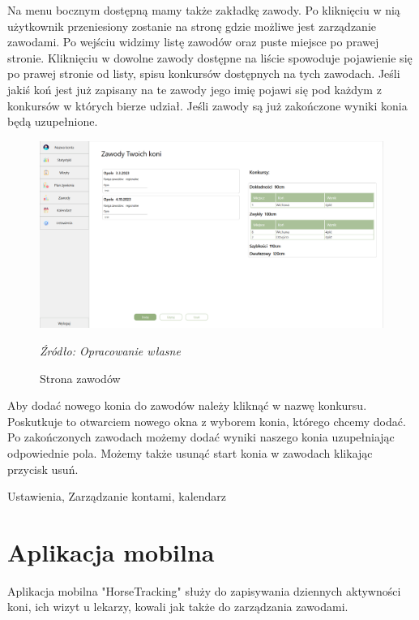 \documentclass[12pt,oneside]{report}
\begin{document}
Na menu bocznym dostępną mamy także zakładkę zawody. Po kliknięciu w nią użytkownik przeniesiony zostanie na stronę gdzie możliwe jest zarządzanie zawodami. Po wejściu widzimy listę zawodów oraz puste miejsce po prawej stronie. Kliknięciu w dowolne zawody dostępne na liście spowoduje pojawienie się po prawej stronie od listy, spisu konkursów dostępnych na tych zawodach. Jeśli jakiś koń jest już zapisany na te zawody jego imię pojawi się pod każdym z konkursów w których bierze udział. Jeśli zawody są już zakończone wyniki konia będą uzupełnione. 
\begin{figure}[h]
\centering
\includegraphics[scale=0.4]{zawody}
\caption{Strona zawodów}
\textit{Źródło: Opracowanie własne}
\label{StronaZawodow}
\end{figure}
Aby dodać nowego konia do zawodów należy kliknąć w nazwę konkursu. Poskutkuje to otwarciem nowego okna z wyborem konia, którego chcemy dodać. Po zakończonych zawodach możemy dodać wyniki naszego konia uzupełniając odpowiednie pola. Możemy także usunąć start konia w zawodach klikając przycisk usuń.



{\color{red} Ustawienia, Zarządzanie kontami, kalendarz}
\newpage
\section{Aplikacja mobilna}
Aplikacja mobilna "HorseTracking" służy do zapisywania dziennych aktywności koni, ich wizyt u lekarzy, kowali jak także do zarządzania zawodami.
\end{document}
